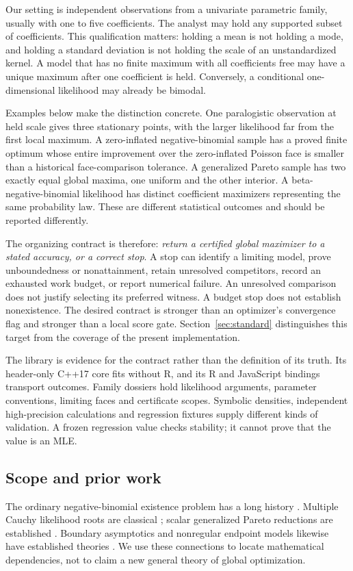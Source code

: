 \documentclass[12pt]{article}
\theoremstyle{definition}
\theoremstyle{remark}
\begin{document}
Our setting is independent observations from a univariate parametric family,
usually with one to five coefficients. The analyst may hold any supported
subset of coefficients. This qualification matters: holding a mean is not
holding a mode, and holding a standard deviation is not holding the scale of
an unstandardized kernel. A model that has no finite maximum with all
coefficients free may have a unique maximum after one coefficient is held.
Conversely, a conditional one-dimensional likelihood may already be bimodal.

Examples below make the distinction concrete. One paralogistic observation
at held scale gives three stationary points, with the larger likelihood far
from the first local maximum. A zero-inflated negative-binomial sample has a
proved finite optimum whose entire improvement over the zero-inflated Poisson
face is smaller than a historical face-comparison tolerance. A generalized
Pareto sample has two exactly equal global maxima, one uniform and the other
interior. A beta-negative-binomial likelihood has distinct coefficient
maximizers representing the same probability law. These are different
statistical outcomes and should be reported differently.

The organizing contract is therefore: \emph{return a certified global
maximizer to a stated accuracy, or a correct stop}. A stop can identify a
limiting model, prove unboundedness or nonattainment, retain unresolved
competitors, record an exhausted work budget, or report numerical failure.
An unresolved comparison does not justify selecting its preferred witness.
A budget stop does not establish nonexistence. The desired contract is
stronger than an optimizer's convergence flag and stronger than a local score
gate. Section~\ref{sec:standard} distinguishes this target from the coverage
of the present implementation.

The library is evidence for the contract rather than the definition of its
truth. Its header-only C++17 core fits without R, and its R and JavaScript
bindings transport outcomes. Family dossiers hold likelihood arguments,
parameter conventions, limiting faces and certificate scopes. Symbolic
densities, independent high-precision calculations and regression fixtures
supply different kinds of validation. A frozen regression value checks
stability; it cannot prove that the value is an MLE.

\subsection{Scope and prior work}
The ordinary negative-binomial existence problem has a long history
\cite{anscombe,levin,aragon,wang}. Multiple Cauchy likelihood roots are
classical \cite{reeds}; scalar generalized Pareto reductions are established
\cite{grimshaw}. Boundary asymptotics and nonregular endpoint models likewise
have established theories \cite{self,smith}. We use these connections to
locate mathematical dependencies, not to claim a new general theory of global
optimization.
\end{document}
